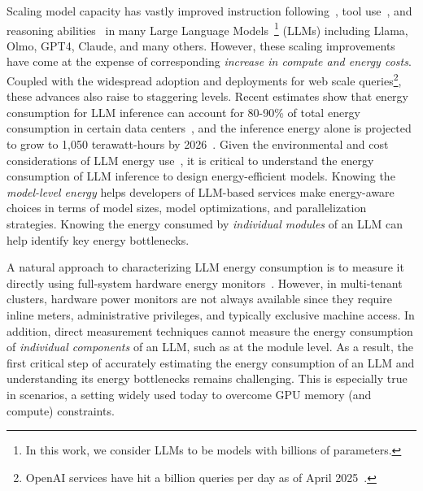 
Scaling model capacity has vastly improved instruction following~\cite{zhang2023instruction}, tool use~\cite{qin2023toolllm}, and reasoning abilities~\cite{xu2025largereasoningmodelssurvey} in many Large Language Models~\footnote{In this work, we consider LLMs to be models with billions of parameters.} (LLMs) including Llama, Olmo, GPT4, Claude, and many others. %
However, these scaling improvements have come at the expense of corresponding \emph{increase in compute and energy costs}.
Coupled with the widespread adoption and deployments for web scale queries\footnote{OpenAI services have hit a billion queries per day as of April 2025~\cite{chatgpt-stats}.}, these advances also raise  to staggering levels. 
Recent estimates show that energy consumption for LLM inference can account for 80-90\% of total energy consumption in certain data centers~\cite{Wenjen_2024}, and the inference energy alone is projected to grow to 1,050 terawatt-hours by 2026~\cite{kakolyris2024sloawaregpufrequencyscaling}.
Given the environmental and cost considerations of LLM energy use~\cite{strubell19,Jesse-dodge-icml}, it is critical to understand the energy consumption of LLM inference to design energy-efficient models.
Knowing the \emph{model-level energy} helps developers of LLM-based services make energy-aware choices in terms of model sizes, model optimizations, and parallelization strategies. 
Knowing the energy consumed by \emph{individual modules} of an LLM can help identify key energy bottlenecks.

A natural approach to characterizing LLM energy consumption is to measure it directly using full-system hardware energy 
monitors~\cite{anthony2020carbontrackertrackingpredictingcarbon, energyVis, mauricio}.
However, in multi-tenant clusters, hardware power monitors are not always available since they require inline meters, administrative privileges, and typically exclusive machine access.
In addition, direct measurement techniques cannot measure the energy consumption of \emph{individual components} of an LLM, such as at the module level.
As a result, the first critical step of accurately estimating the energy consumption of an LLM and understanding its energy bottlenecks remains challenging. This is especially true in  scenarios, a setting widely used today to overcome GPU memory (and compute) constraints.

